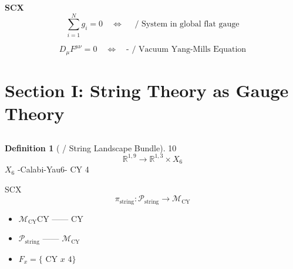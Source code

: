\documentclass[12pt,a4paper]{article}
\theoremstyle{plain}
\theoremstyle{definition}
\newtheorem{definition}[theorem]{ Definition}
\newcommand{\R}{\mathbb{R}}
\newcommand{\M}{\mathcal{M}}
\newcommand{\Pcal}{\mathcal{P}}
\begin{document}
\begin{keyeq}
\textbf{SCX }
\begin{equation}
    \boxed{\sum_{i=1}^{N} g_i = 0 \quad \Longleftrightarrow \quad
    \text{ / System in global flat gauge}}
\end{equation}

\textbf{}
\begin{equation}
    \boxed{D_\mu F^{\mu\nu} = 0 \quad \Longleftrightarrow \quad
    \text{- / Vacuum Yang-Mills Equation}}
\end{equation}
\end{keyeq}

\newpage


\section{}
\section*{Section I: String Theory as Gauge Theory}


\subsection{}

\begin{definition}[ / String Landscape Bundle]
10
\begin{equation}
    \R^{1,9} \to \R^{1,3} \times X_6
\end{equation}
 $X_6$ -Calabi-Yau6- CY 
4

 SCX \textbf{}
\begin{equation}
    \pi_{\text{string}}: \Pcal_{\text{string}} \to \M_{\text{CY}}
\end{equation}

\begin{itemize}
    \item $\M_{\text{CY}}$CY —— CY 
    \item $\Pcal_{\text{string}}$ ——  $\M_{\text{CY}}$ 
    \item $F_x = \{\text{ CY  } x \text{ 4}\}$
\end{itemize}
\end{definition}
\end{document}
